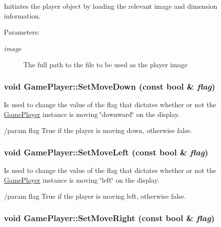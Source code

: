 Initiates the player object by loading the relevant image and dimension information.

\begin{Desc}
\item[Parameters:]
\begin{description}
\item[{\em image}]The full path to the file to be used as the player image \end{description}
\end{Desc}
\hypertarget{class_game_player_5caad1d0b2fff21b883f609cbdbd4575}{
\subsubsection[{SetMoveDown}]{\setlength{\rightskip}{0pt plus 5cm}void GamePlayer::SetMoveDown (const bool \& {\em flag})}}
\label{d7/df6/class_game_player_5caad1d0b2fff21b883f609cbdbd4575}


Is used to change the value of the flag that dictates whether or not the \hyperlink{class_game_player}{GamePlayer} instance is moving \char`\"{}downward\char`\"{} on the display.

/param flag True if the player is moving down, otherwise false. \hypertarget{class_game_player_336298f2d286c4b2188bc9a03fac9c6d}{
\subsubsection[{SetMoveLeft}]{\setlength{\rightskip}{0pt plus 5cm}void GamePlayer::SetMoveLeft (const bool \& {\em flag})}}
\label{d7/df6/class_game_player_336298f2d286c4b2188bc9a03fac9c6d}


Is used to change the value of the flag that dictates whether or not the \hyperlink{class_game_player}{GamePlayer} instance is moving \char`\"{}left\char`\"{} on the display.

/param flag True if the player is moving left, otherwise false. \hypertarget{class_game_player_c53032c2085250782126d5969a1cba32}{
\subsubsection[{SetMoveRight}]{\setlength{\rightskip}{0pt plus 5cm}void GamePlayer::SetMoveRight (const bool \& {\em flag})}}
\label{d7/df6/class_game_player_c53032c2085250782126d5969a1cba32}


